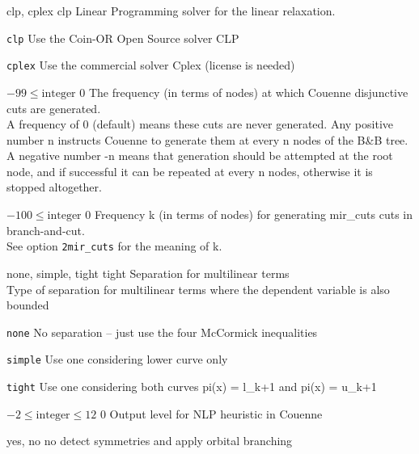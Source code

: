 %
{\ttfamily clp, cplex}%
{clp}%
{Linear Programming solver for the linear relaxation.}%
{\begin{list}{}{
\setlength{\parsep}{0em}
\setlength{\leftmargin}{5ex}
\setlength{\labelwidth}{2ex}
\setlength{\itemindent}{0ex}
\setlength{\topsep}{0pt}}
\item[\texttt{clp}] Use the Coin-OR Open Source solver CLP
\item[\texttt{cplex}] Use the commercial solver Cplex (license is needed)
\end{list}
}

%
{$-99\leq\textrm{integer}$}%
{$0$}%
{The frequency (in terms of nodes) at which Couenne disjunctive cuts are generated.\\
A frequency of 0 (default) means these cuts are never generated. Any positive number n instructs Couenne to generate them at every n nodes of the B\&B tree. A negative number -n means that generation should be attempted at the root node, and if successful it can be repeated at every n nodes, otherwise it is stopped altogether.}%
{}

%
{$-100\leq\textrm{integer}$}%
{$0$}%
{Frequency k (in terms of nodes) for generating mir\_cuts cuts in branch-and-cut.\\
See option \texttt{2mir\_cuts} for the meaning of k.}%
{}

%
{\ttfamily none, simple, tight}%
{tight}%
{Separation for multilinear terms\\
Type of separation for multilinear terms where the dependent variable is also bounded}%
{\begin{list}{}{
\setlength{\parsep}{0em}
\setlength{\leftmargin}{5ex}
\setlength{\labelwidth}{2ex}
\setlength{\itemindent}{0ex}
\setlength{\topsep}{0pt}}
\item[\texttt{none}] No separation -- just use the four McCormick inequalities
\item[\texttt{simple}] Use one considering lower curve only
\item[\texttt{tight}] Use one considering both curves pi(x) = l\_{k+1} and pi(x) = u\_{k+1}
\end{list}
}

%
{$-2\leq\textrm{integer}\leq12$}%
{$0$}%
{Output level for NLP heuristic in Couenne}%
{}

%
{\ttfamily yes, no}%
{no}%
{detect symmetries and apply orbital branching}%
{}

